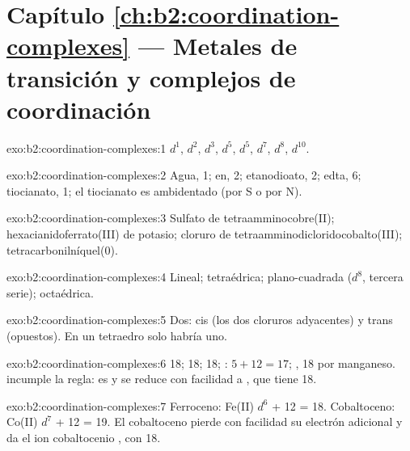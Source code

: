 \section*{Capítulo \ref{ch:b2:coordination-complexes} --- Metales de transición y complejos de coordinación}

\begin{solution}{exo:b2:coordination-complexes:1}
 $d^1$,  $d^2$,  $d^3$,  $d^5$,  $d^5$, 
$d^7$,  $d^8$,  $d^{10}$.
\end{solution}

\begin{solution}{exo:b2:coordination-complexes:2}
Agua, 1; en, 2; etanodioato, 2; edta, 6; tiocianato, 1; el tiocianato es ambidentado
(por S o por N).
\end{solution}

\begin{solution}{exo:b2:coordination-complexes:3}
Sulfato de tetraamminocobre(II); hexacianidoferrato(III) de potasio;
cloruro de tetraamminodicloridocobalto(III); tetracarbonilníquel(0).
\end{solution}

\begin{solution}{exo:b2:coordination-complexes:4}
Lineal; tetraédrica; plano-cuadrada ($d^8$, tercera serie); octaédrica.
\end{solution}

\begin{solution}{exo:b2:coordination-complexes:5}
Dos: cis (los dos cloruros adyacentes) y trans (opuestos). En un tetraedro
solo habría uno.
\end{solution}

\begin{solution}{exo:b2:coordination-complexes:6}
 18;  18;  18; : $5 + 12 = 17$;
, 18 por manganeso.  incumple la regla: es  y
se reduce con facilidad a \ce{[V(CO)6]-}, que tiene 18.
\end{solution}

\begin{solution}{exo:b2:coordination-complexes:7}
Ferroceno: Fe(II) $d^6$ + 12 = 18. Cobaltoceno: Co(II) $d^7$ + 12 = 19. El cobaltoceno pierde
con facilidad su electrón adicional y da el ion cobaltocenio \ce{[Co(C5H5)2]+}, con 18.
\end{solution}


